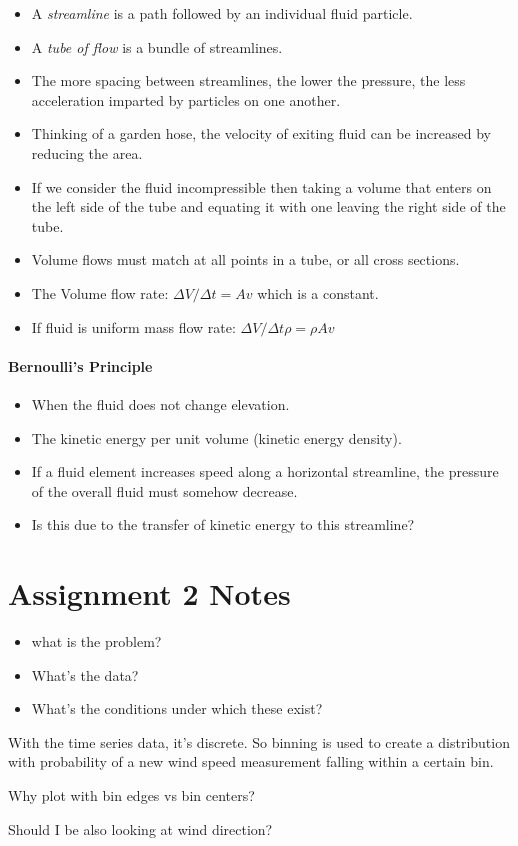 \documentclass[11pt]{article}
\begin{document}
\begin{itemize}
\tightlist
\item
  A \emph{streamline} is a path followed by an individual fluid
  particle.
\item
  A \emph{tube of flow} is a bundle of streamlines.
\item
  The more spacing between streamlines, the lower the pressure, the less
  acceleration imparted by particles on one another.
\item
  Thinking of a garden hose, the velocity of exiting fluid can be
  increased by reducing the area.
\item
  If we consider the fluid incompressible then taking a volume that
  enters on the left side of the tube and equating it with one leaving
  the right side of the tube.
\item
  Volume flows must match at all points in a tube, or all cross
  sections.
\item
  The Volume flow rate: \(\Delta V/\Delta t = Av\) which is a constant.
\item
  If fluid is uniform mass flow rate:
  \(\Delta V/\Delta t \rho = \rho Av\)
\end{itemize}

\hypertarget{bernoullis-principle}{%
\paragraph{Bernoulli's Principle}\label{bernoullis-principle}}

\begin{itemize}
\tightlist
\item
  When the fluid does not change elevation.
\item
  The kinetic energy per unit volume (kinetic energy density).
\item
  If a fluid element increases speed along a horizontal streamline, the
  pressure of the overall fluid must somehow decrease.
\item
  Is this due to the transfer of kinetic energy to this streamline?
\end{itemize}

\hypertarget{assignment-2-notes}{%
\section{Assignment 2 Notes}\label{assignment-2-notes}}

\begin{itemize}
\tightlist
\item
  what is the problem?
\item
  What's the data?
\item
  What's the conditions under which these exist?
\end{itemize}

With the time series data, it's discrete. So binning is used to create a
distribution with probability of a new wind speed measurement falling
within a certain bin.

Why plot with bin edges vs bin centers?

Should I be also looking at wind direction?
\end{document}
